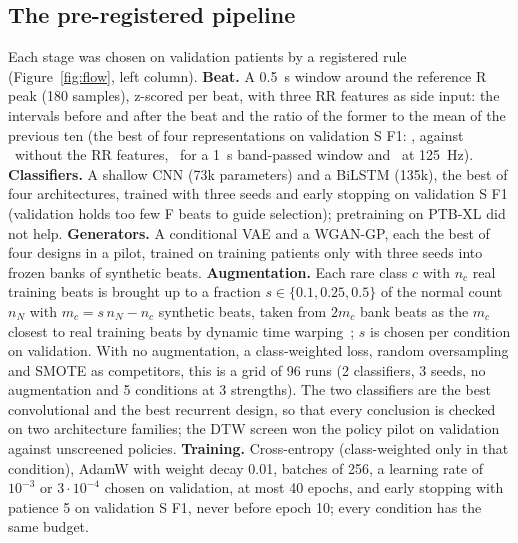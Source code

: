 \documentclass[10pt,a4paper]{article}
\begin{document}
\subsection{The pre-registered pipeline}\label{sec:pipeline}
Each stage was chosen on validation patients by a registered rule (Figure~\ref{fig:flow}, left column).
\textbf{Beat.} A 0.5~s window around the reference R peak (180 samples), z-scored per beat, with three RR features as side input:
the intervals before and after the beat and the ratio of the former to the mean of the previous ten (the best of four
representations on validation S F1: \PhaseOneInputRepresentationCMean, against \PhaseOneInputRepresentationAMean\ without the RR features,
\PhaseOneInputRepresentationBMean\ for a 1~s band-passed window and \PhaseOneInputRepresentationDMean\ at 125~Hz). \textbf{Classifiers.} A shallow CNN (73k parameters) and a BiLSTM (135k), the best of four architectures, trained
with three seeds and early stopping on validation S F1 (validation holds too few F beats to guide selection); pretraining on PTB-XL
did not help. \textbf{Generators.} A conditional VAE and a WGAN-GP, each the best of four designs in a pilot, trained on training
patients only with three seeds into frozen banks of synthetic beats. \textbf{Augmentation.} Each rare class $c$ with $n_c$ real
training beats is brought up to a fraction $s\in\{0.1, 0.25, 0.5\}$ of the normal count $n_N$ with $m_c = s\,n_N - n_c$ synthetic
beats, taken from $2m_c$ bank beats as the $m_c$ closest to real training beats by dynamic time warping~\cite{sakoe1978dtw}; $s$ is
chosen per condition on validation. With no augmentation, a class-weighted loss, random oversampling and SMOTE as competitors, this
is a grid of 96 runs (2 classifiers, 3 seeds, no augmentation and 5 conditions at 3 strengths). The two classifiers are the best
convolutional and the best recurrent design, so that every conclusion is checked on two architecture families; the DTW screen won
the policy pilot on validation against unscreened policies. \textbf{Training.} Cross-entropy
(class-weighted only in that condition), AdamW with weight decay 0.01, batches of 256, a learning rate of $10^{-3}$ or
$3\cdot10^{-4}$ chosen on validation, at most 40 epochs, and early stopping with patience 5 on validation S F1, never before
epoch 10; every condition has the same budget.
\end{document}
